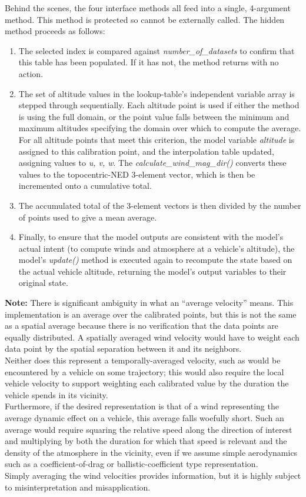 \documentclass[11pt,fleqn]{report}
\begin{document}
Behind the scenes, the four interface methods all feed into a single,
4-argument method. This method is protected so cannot be externally called.
The hidden method proceeds as follows:

\begin{enumerate}
\item The selected index is compared against \textit{number\_of\_datasets}
  to confirm that this table has been populated. If it has not, the method
  returns with no action.
\item The set of altitude values in the lookup-table's independent variable
  array is stepped
  through sequentially. Each altitude point is used if either the method is
  using the full domain, or the point value falls between the minimum and
  maximum altitudes specifying the domain over which to compute the average.
  For all altitude points that meet this criterion, the model variable
  \textit{altitude} is
  assigned to this calibration point, and the interpolation table updated,
  assigning values to \textit{u, v, w}. The
  \textit{calculate\_wind\_mag\_dir()} converts these values to the
  topocentric-NED 3-element vector, which is then be incremented onto a
  cumulative total.
\item The accumulated total of the 3-element vectors is then divided by the
  number of points used to give a mean average.
\item Finally, to ensure that the model outputs are consistent with the
  model's actual intent (to compute winds and atmosphere at a vehicle's
  altitude), the model's \textit{update()} method is executed again to
  recompute the state based on the actual vehicle altitude, returning
  the model's output variables to their original state.
\end{enumerate}

\textbf{Note:}
There is significant ambiguity in what an ``average velocity'' means. This
implementation is an average over the calibrated points, but this is not the
same as a spatial average because there is no verification that the data
points are equally distributed. A spatially averaged wind velocity would
have to weight each data point by the spatial separation between it and its
neighbors.\\
Neither does this represent a temporally-averaged velocity, such as
would be encountered by a vehicle on
some trajectory; this would also require the local vehicle velocity to
support weighting each calibrated value by the duration the vehicle spends
in its vicinity.\\
Furthermore, if the desired representation is that of a wind representing
the average dynamic effect on a vehicle, this average falls woefully short.
Such an average would require
squaring the relative speed along the direction of interest and multiplying
by both the duration for which that speed is relevant and the density of the
atmosphere in the vicinity, even if we assume simple aerodynamics such as a
coefficient-of-drag or ballistic-coefficient type representation.\\
Simply averaging the wind velocities provides
information, but it is highly subject to misinterpretation and
misapplication.
\end{document}
